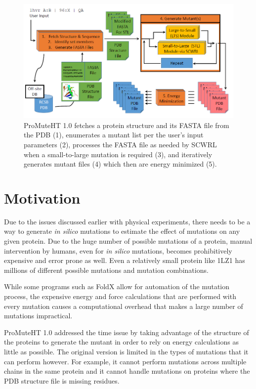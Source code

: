 \documentclass[sigconf]{acmart}
\begin{document}
\begin{figure}[t]
\includegraphics[width=0.95\columnwidth]{Figures/proMute1.png}
\caption{ProMuteHT 1.0 fetches a protein structure and its FASTA file from the PDB (1), enumerates a mutant list per the user's input parameters (2), processes the FASTA file as needed by SCWRL~\cite{krivov2009} when a small-to-large mutation is required (3), and iteratively generates mutant files (4) which then are energy minimized (5).}
\label{proMute1Pipeline}
\end{figure}

\section{Motivation}
Due to the issues discussed earlier with physical experiments, there needs to be a way to generate \textit{in silico} mutations to estimate the effect of mutations on any given protein.  Due to the huge number of possible mutations of a protein, manual intervention by humans, even for \textit{in silico} mutations, becomes prohibitively expensive and error prone as well.  Even a relatively small protein like 1LZ1 has millions of different possible mutations and mutation combinations.

While some programs such as FoldX allow for automation of the mutation process, the expensive energy and force calculations that are performed with every mutation causes a computational overhead that makes a large number of mutations impractical.  

ProMuteHT 1.0 addressed the time issue by taking advantage of the structure of the proteins to generate the mutant in order to rely on energy calculations as little as possible.  The original version is limited in the types of mutations that it can perform however. For example, it cannot perform mutations across multiple chains in the same protein and it cannot handle mutations on proteins where the PDB structure file is missing residues.
\end{document}
